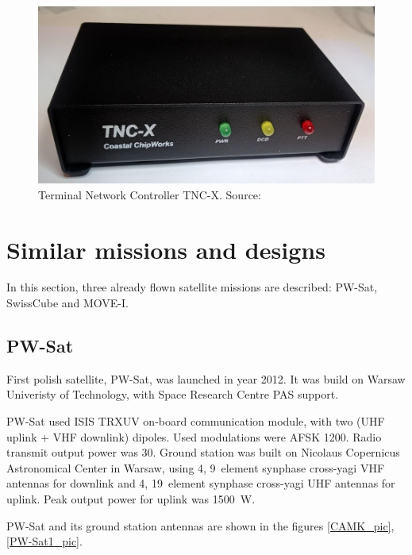 \begin{figure}[H]
    \centering
    \includegraphics[width=0.3\paperwidth]{img/1/tncx.jpg}
    \caption{Terminal Network Controller TNC-X. Source: \cite{tncx}}
    \label{tncx}
\end{figure}



\chapter{Similar missions and designs}
In this section, three already flown satellite missions are described: PW-Sat, SwissCube and MOVE-I. 
\section{PW-Sat}
First polish satellite, PW-Sat, was launched in year \si{2012}. It was build on Warsaw Univeristy of Technology, with Space Research Centre PAS support. 

PW-Sat used ISIS TRXUV on-board communication module, with two (UHF uplink + VHF downlink) dipoles. Used modulations were AFSK \SI{1200}{\bps}. Radio transmit output power was \SI{30}{\dBm}. 
Ground station was built on Nicolaus Copernicus Astronomical Center in Warsaw, using \si{4}, \si{9}~element synphase cross-yagi VHF antennas for downlink and \si{4}, \si{19}~element synphase cross-yagi UHF antennas for uplink. Peak output power for uplink was \SI{1500}{\watt}.

PW-Sat and its ground station antennas are shown in the figures \ref{CAMK_pic}, \ref{PW-Sat1_pic}.

